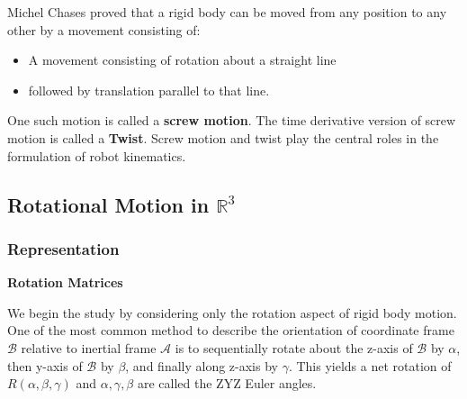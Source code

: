 \documentclass[letterpaper]{article}
\begin{document}
Michel Chases proved that a rigid body can be moved from any position to any other by a movement consisting of:\vspace{-0.5em}
\begin{itemize}
    \item A movement consisting of rotation about a straight line\vspace{-1em}
    \item followed by translation parallel to that line. \vspace{-0.5em}
\end{itemize}
One such motion is called a \textbf{screw motion}. The time derivative version of screw motion is called a
\textbf{Twist}. Screw motion and twist play the central roles in the formulation of robot kinematics. 

\subsection{Rotational Motion in $\mathbb{R}^3$}

\subsubsection{Representation} \label{sec:rotmat}
\textbf{Rotation Matrices}

We begin the study by considering only the rotation aspect of rigid body motion. 
One of the most common method to describe the orientation of coordinate frame $\mathcal{B}$ relative to
inertial frame $\mathcal{A}$ is to sequentially rotate about the z-axis of $\mathcal{B}$ by $\alpha$, 
then y-axis of $\mathcal{B}$ by $\beta$, and finally along z-axis by $\gamma$. This yields a net rotation
of $R(\alpha, \beta, \gamma)$ and $\alpha, \gamma, \beta$ are called the ZYZ Euler angles. 
\end{document}
